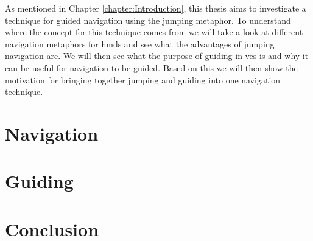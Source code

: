 \label{chapter:Related Work}
As mentioned in Chapter \ref{chapter:Introduction}, this thesis aims to investigate a technique for guided navigation using the jumping metaphor. To understand where the concept for this technique comes from we will take a look at different navigation metaphors for \acrshort{hmd}s and see what the advantages of jumping navigation are. We will then see what the purpose of guiding in \acrshort{ve}s is and why it can be useful for navigation to be guided. Based on this we will then show the motivation for bringing together jumping and guiding into one navigation technique. 

\section{Navigation}
\label{section:RW Navigation}

\section{Guiding}
\label{section:RW Guiding}
\section{Conclusion}
\label{section:RW Conclusion}
